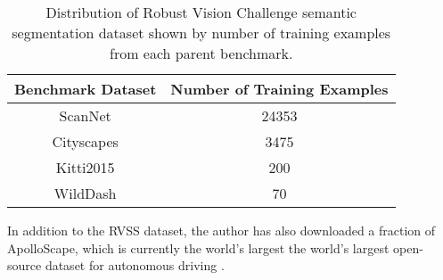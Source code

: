\documentclass[10pt,twocolumn,letterpaper]{article}
\begin{document}
\begin{table}[t]
\begin{center}
  \begin{tabular}{|c|c|}
    \hline
      Benchmark Dataset & Number of Training Examples \\
      \hline
      ScanNet & 24353 \\
      Cityscapes & 3475 \\
      Kitti2015 & 200 \\
      WildDash & 70 \\
      \hline
  \end{tabular}
\end{center}
\caption{Distribution of Robust Vision Challenge semantic segmentation dataset shown by number of training examples from each parent benchmark.}
\label{table:trainingDomainDist}
\end{table}

In addition to the RVSS dataset, the author has also downloaded a fraction of ApolloScape, which is currently the world's largest
the world's largest open-source dataset for autonomous driving \cite{huang2018apolloscape}.

\end{document}
